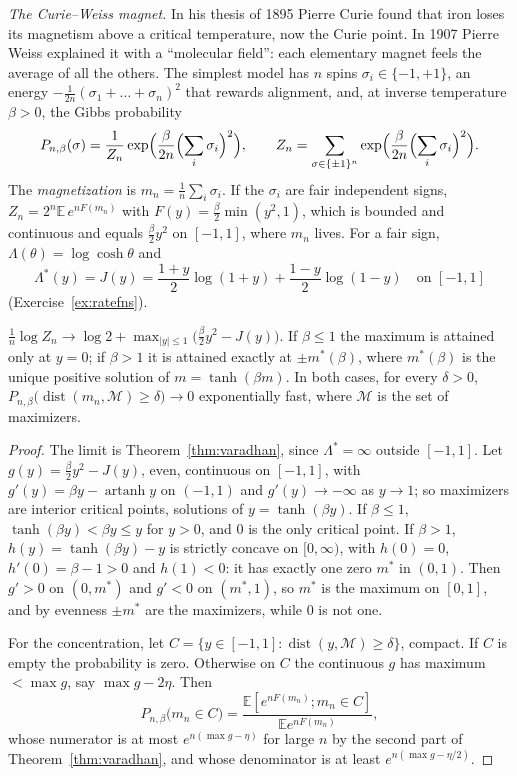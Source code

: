 \emph{The Curie--Weiss magnet.} In his thesis of 1895 Pierre Curie found that iron loses its magnetism above a critical temperature, now the Curie point. In 1907 Pierre
Weiss explained it with a ``molecular field'': each elementary magnet feels the average of all the others. The simplest model has $n$ spins $\sigma_i\in\{-1,+1\}$, an energy
$-\frac1{2n}(\sigma_1+\dots+\sigma_n)^2$ that rewards alignment, and, at inverse temperature $\beta>0$, the Gibbs probability
\[
P_{n,\beta}(\sigma)=\frac1{Z_n}\exp\Bigl(\frac\beta{2n}\Bigl(\sum_i\sigma_i\Bigr)^2\Bigr),\qquad Z_n=\sum_{\sigma\in\{\pm1\}^n}\exp\Bigl(\frac\beta{2n}\Bigl(\sum_i\sigma_i\Bigr)^2\Bigr).
\]
The \emph{magnetization} is $m_n=\frac1n\sum_i\sigma_i$. If the $\sigma_i$ are fair independent signs, $Z_n=2^n\mathbb E\,e^{nF(m_n)}$ with $F(y)=\frac\beta2\min(y^2,1)$, which is bounded
and continuous and equals $\frac\beta2y^2$ on $[-1,1]$, where $m_n$ lives. For a fair sign, $\Lambda(\theta)=\log\cosh\theta$ and
\[
\Lambda^*(y)=J(y)=\frac{1+y}2\log(1+y)+\frac{1-y}2\log(1-y)\quad\text{on }[-1,1]
\]
(Exercise~\ref{ex:ratefns}).

\begin{theorem}\label{thm:curieweiss}
$\frac1n\log Z_n\to\log2+\max_{|y|\le1}\bigl(\frac\beta2y^2-J(y)\bigr)$. If $\beta\le1$ the maximum is attained only at $y=0$; if $\beta>1$ it is attained exactly at $\pm m^*(\beta)$, where
$m^*(\beta)$ is the unique positive solution of $m=\tanh(\beta m)$. In both cases, for every $\delta>0$, $P_{n,\beta}\bigl(\operatorname{dist}(m_n,\mathcal M)\ge\delta\bigr)\to0$ exponentially fast,
where $\mathcal M$ is the set of maximizers.
\end{theorem}
\begin{proof}
The limit is Theorem~\ref{thm:varadhan}, since $\Lambda^*=\infty$ outside $[-1,1]$. Let $g(y)=\frac\beta2y^2-J(y)$, even, continuous on $[-1,1]$, with $g'(y)=\beta y-\operatorname{artanh}y$ on
$(-1,1)$ and $g'(y)\to-\infty$ as $y\to1$; so maximizers are interior critical points, solutions of $y=\tanh(\beta y)$. If $\beta\le1$, $\tanh(\beta y)<\beta y\le y$ for $y>0$, and $0$ is the only
critical point. If $\beta>1$, $h(y)=\tanh(\beta y)-y$ is strictly concave on $[0,\infty)$, with $h(0)=0$, $h'(0)=\beta-1>0$ and $h(1)<0$: it has exactly one zero $m^*$ in $(0,1)$. Then
$g'>0$ on $(0,m^*)$ and $g'<0$ on $(m^*,1)$, so $m^*$ is the maximum on $[0,1]$, and by evenness $\pm m^*$ are the maximizers, while $0$ is not one.

For the concentration, let $C=\{y\in[-1,1]:\operatorname{dist}(y,\mathcal M)\ge\delta\}$, compact. If $C$ is empty the probability is zero. Otherwise on $C$ the continuous $g$ has maximum $<\max g$, say $\max g-2\eta$. Then
\[
P_{n,\beta}\bigl(m_n\in C\bigr)=\frac{\mathbb E[e^{nF(m_n)};m_n\in C]}{\mathbb Ee^{nF(m_n)}},
\]
whose numerator is at most $e^{n(\max g-\eta)}$ for large $n$ by the second part of Theorem~\ref{thm:varadhan}, and whose denominator is at least $e^{n(\max g-\eta/2)}$.
\end{proof}

